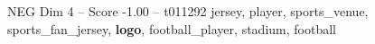 \begin{textsample}{NEG Dim 4 – Score -1.00 – t011292}  \label{ex:f4_neg_040}
jersey, player, sports\_venue, sports\_fan\_jersey, \textbf{logo}, football\_player, stadium, football

\end{textsample}
